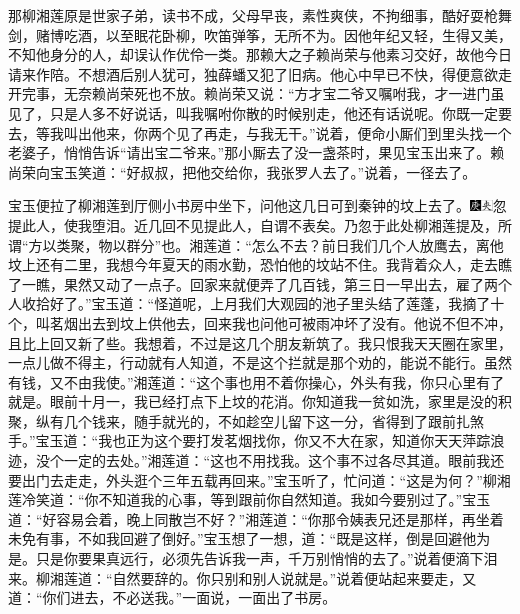 那柳湘莲原是世家子弟，读书不成，父母早丧，素性爽侠，不拘细事，酷好耍枪舞剑，赌博吃酒，以至眠花卧柳，吹笛弹筝，无所不为。因他年纪又轻，生得又美，不知他身分的人，却误认作优伶一类。那赖大之子赖尚荣与他素习交好，故他今日请来作陪。不想酒后别人犹可，独薛蟠又犯了旧病。他心中早已不快，得便意欲走开完事，无奈赖尚荣死也不放。赖尚荣又说：“方才宝二爷又嘱咐我，才一进门虽见了，只是人多不好说话，叫我嘱咐你散的时候别走，他还有话说呢。你既一定要去，等我叫出他来，你两个见了再走，与我无干。”说着，便命小厮们到里头找一个老婆子，悄悄告诉“请出宝二爷来。”那小厮去了没一盏茶时，果见宝玉出来了。赖尚荣向宝玉笑道：“好叔叔，把他交给你，我张罗人去了。”说着，一径去了。

宝玉便拉了柳湘莲到厅侧小书房中坐下，问他这几日可到秦钟的坟上去了。{\includegraphics[width=3mm]{../Images/00004}\includegraphics[width=3mm]{../Images/00012}\footnotesize \kaishu 忽提此人，使我堕泪。近几回不见提此人，自谓不表矣。乃忽于此处柳湘莲提及，所谓“方以类聚，物以群分”也。}湘莲道：“怎么不去？前日我们几个人放鹰去，离他坟上还有二里，我想今年夏天的雨水勤，恐怕他的坟站不住。我背着众人，走去瞧了一瞧，果然又动了一点子。回家来就便弄了几百钱，第三日一早出去，雇了两个人收拾好了。”宝玉道：“怪道呢，上月我们大观园的池子里头结了莲蓬，我摘了十个，叫茗烟出去到坟上供他去，回来我也问他可被雨冲坏了没有。他说不但不冲，且比上回又新了些。我想着，不过是这几个朋友新筑了。我只恨我天天圈在家里，一点儿做不得主，行动就有人知道，不是这个拦就是那个劝的，能说不能行。虽然有钱，又不由我使。”湘莲道：“这个事也用不着你操心，外头有我，你只心里有了就是。眼前十月一，我已经打点下上坟的花消。你知道我一贫如洗，家里是没的积聚，纵有几个钱来，随手就光的，不如趁空儿留下这一分，省得到了跟前扎煞手。”宝玉道：“我也正为这个要打发茗烟找你，你又不大在家，知道你天天萍踪浪迹，没个一定的去处。”湘莲道：“这也不用找我。这个事不过各尽其道。眼前我还要出门去走走，外头逛个三年五载再回来。”宝玉听了，忙问道：“这是为何？”柳湘莲冷笑道：“你不知道我的心事，等到跟前你自然知道。我如今要别过了。”宝玉道：“好容易会着，晚上同散岂不好？”湘莲道：“你那令姨表兄还是那样，再坐着未免有事，不如我回避了倒好。”宝玉想了一想，道：“既是这样，倒是回避他为是。只是你要果真远行，必须先告诉我一声，千万别悄悄的去了。”说着便滴下泪来。柳湘莲道：“自然要辞的。你只别和别人说就是。”说着便站起来要走，又道：“你们进去，不必送我。”一面说，一面出了书房。

